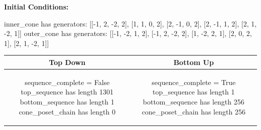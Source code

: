 \documentclass[10pt]{article}
\begin{document}
\textbf{Initial Conditions:}
\begin{SAGE}
inner_cone has generators: 
[[-1, 2, -2, 2], [1, 1, 0, 2], [2, -1, 0, 2], [2, -1, 1, 2], [2, 1, -2, 1]]
outer_cone has generators: 
[[-1, -2, 1, 2], [-1, 2, -2, 2], [1, -2, 2, 1], [2, 0, 2, 1], [2, 1, -2, 1]]

\end{SAGE}
\begin{tabular}{c|c}
\textbf{Top Down} & \textbf{Bottom Up} \\ \hline  
\begin{SAGE}
sequence_complete = False
top_sequence has length 1301
bottom_sequence has length 1
cone_poset_chain has length 0
\end{SAGE} 
&
\begin{SAGE}
sequence_complete = True
top_sequence has length 1
bottom_sequence has length 256
cone_poset_chain has length 256
\end{SAGE} 
\\ \hline


\end{tabular}
\end{document}

